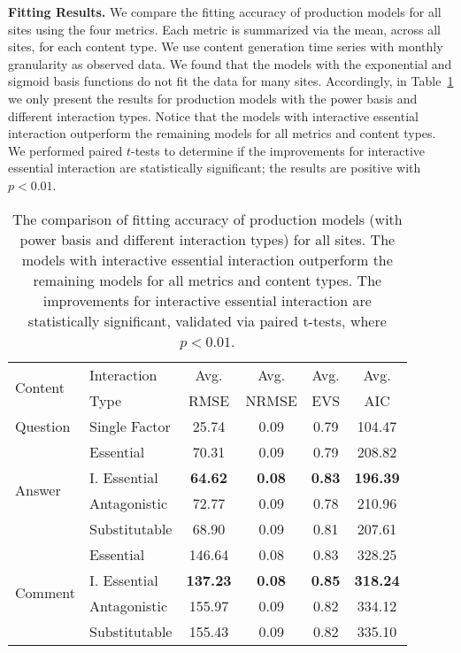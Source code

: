\textbf{Fitting Results.} We compare the fitting accuracy of production models for all  sites using the four metrics. Each metric is summarized via the mean, across all sites, for each content type. We use content generation time series with monthly granularity as observed data. We found that the models with the exponential and sigmoid basis functions do not fit the data for many  sites. Accordingly, in Table~\ref{tbl:model_fit} we only present the results for production models with the power basis and different interaction types. Notice that the models with interactive essential interaction outperform the remaining models for all metrics and content types. We performed paired $t$-tests to determine if the improvements for interactive essential interaction are statistically significant; the results are positive with $p<0.01$.

\begin{table}[ht]
	\caption{The comparison of fitting accuracy of production models (with power basis and different interaction types) for all  sites. The models with interactive essential interaction outperform the remaining models for all metrics and content types. The improvements for interactive essential interaction are statistically significant, validated via paired t-tests, where $p<0.01$.}
	\label{tbl:model_fit}
	\begin{center}
	\begin{tabular}{llcccc}
    \toprule
    \multirow{2}{*}{Content} & Interaction & Avg. & Avg. & Avg. & Avg.\\
    & Type & RMSE & NRMSE & EVS & AIC\\
    \midrule
    Question & Single Factor & 25.74 & 0.09 & 0.79 & 104.47\\
    \midrule
    \multirow{4}{*}{Answer} & Essential & 70.31 & 0.09 & 0.79 & 208.82\\
    & I. Essential & \textbf{64.62} & \textbf{0.08} & \textbf{0.83} & \textbf{196.39}\\
    & Antagonistic & 72.77 & 0.09 &  0.78 & 210.96\\
    & Substitutable & 68.90 & 0.09 & 0.81 & 207.61\\
    \midrule
    \multirow{4}{*}{Comment} & Essential & 146.64 & 0.08 & 0.83 & 328.25\\
    & I. Essential & \textbf{137.23} & \textbf{0.08} & \textbf{0.85} & \textbf{318.24}\\
    & Antagonistic & 155.97 & 0.09 &  0.82 & 334.12\\
    & Substitutable & 155.43 & 0.09 & 0.82 & 335.10\\
    \bottomrule
	\end{tabular}
	\end{center}
\end{table}

